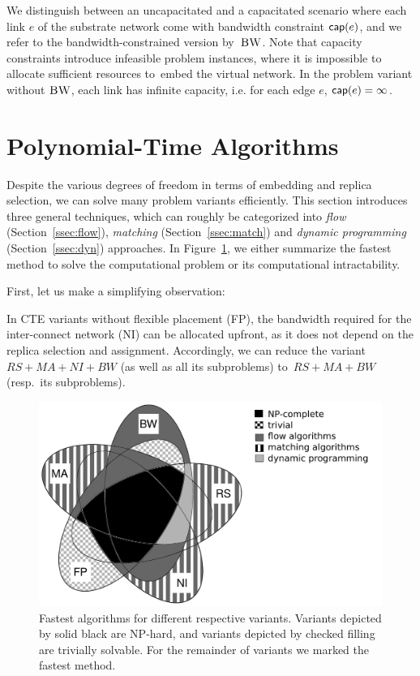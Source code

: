 We distinguish between an uncapacitated and a capacitated scenario where each link $e$
of the substrate network come with bandwidth
constraint $\textsf{cap}(e)$, and we refer to the bandwidth-constrained version by~$\textsc{BW}$.
Note that capacity constraints introduce infeasible problem instances, where it is impossible to
allocate sufficient resources to~embed the virtual network.
In the problem variant without $\textsc{BW}$, each link has infinite capacity, i.e. for each edge $e$, $\textsf{cap}(e) = \infty$.

\section{Polynomial-Time Algorithms}\label{sec:poly}


Despite the various degrees of freedom in terms of embedding and replica selection,
we can solve many problem variants efficiently.
 This section introduces three general techniques,
 which can roughly be categorized into
 \emph{flow} (Section~\ref{ssec:flow}), \emph{matching} (Section~\ref{ssec:match}) and \emph{dynamic programming}
 (Section~\ref{ssec:dyn}) approaches.
In Figure~\ref{fig:venn_full}, we either summarize the fastest method to solve the computational problem or its computational intractability.
 
First, let us make a simplifying observation:
\begin{obs}\label{obs:nofp}
In CTE variants without flexible placement (FP),
the bandwidth required
for the inter-connect network (NI) can be allocated upfront, 
as it
does not depend on the replica
selection and assignment.
Accordingly, we can reduce the variant~$RS+MA+NI+BW$ (as well as all its subproblems)
to~$RS+MA+BW$ (resp.~its subproblems).
\end{obs}

\begin{figure}[t]
\centering
\includegraphics[width=0.69\columnwidth]{figs/static-mapping/venn_full2}
\caption{Fastest algorithms for different respective variants. Variants depicted by solid black are NP-hard, and variants depicted by checked filling are trivially solvable. For the remainder of variants we marked the fastest method.}
\label{fig:venn_full}
\end{figure}


